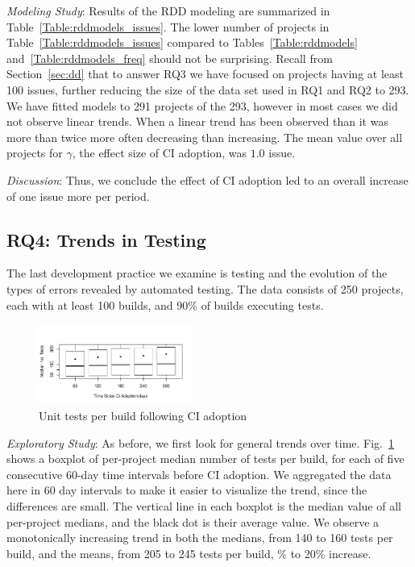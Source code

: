 

\smallskip\noindent \emph{Modeling Study}:
Results of the RDD modeling are summarized in Table~\ref{Table:rddmodels_issues}.
The lower number of projects in Table~\ref{Table:rddmodels_issues} 
compared to Tables~\ref{Table:rddmodels} and~\ref{Table:rddmodels_freq} 
should not be surprising. 
Recall from Section~\ref{sec:dd} that to answer RQ3 we have focused on 
projects having at least 100 issues, further reducing the size of the data set 
used in RQ1 and RQ2 to 293.
We have fitted models to 291 projects of the 293, however in most cases we 
did not observe linear trends.
When a linear trend has been observed than it was more than twice more 
often decreasing than increasing.
The mean value over all projects for $\gamma$, the effect size of CI adoption, 
was $1.0$ issue.


\smallskip\noindent \emph{Discussion}:
 Thus, we conclude the effect of CI adoption led to an overall increase of one 
 issue more per period.




\subsection{RQ4: Trends in Testing}

The last development practice we examine is testing and the evolution 
of the types of errors revealed by automated testing.
The data consists of 250 projects, each with at least 100 builds, and 90\% 
of builds executing tests.

\begin{figure}[!t]
\centering
\includegraphics[width=0.45\textwidth, clip=true, trim=0 15 15 50]{tests.pdf}
\caption{Unit tests per build following CI adoption}
\label{Fig:Tests}
\end{figure}

\smallskip\noindent \emph{Exploratory Study}: 
As before, we first look for general trends over time.
Fig.~\ref{Fig:Tests} shows a boxplot of per-project median number of tests 
per build, for each of five consecutive 60-day time intervals before CI adoption.
We aggregated the data here in 60 day intervals to make it easier to visualize 
the trend, since the differences are small.
The vertical line in each boxplot is the median value of all per-project medians, 
and the black dot is their average value.
We observe a monotonically increasing trend in both the medians, from 140 to 
160 tests per build, and the means, from 205 to 245 tests per build, \% to 
20\% increase. 

